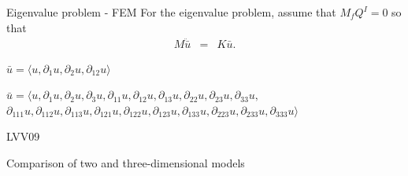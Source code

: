 \documentclass{beamer}
\begin{document}
\begin{frame}{Eigenvalue problem - FEM}
    For the eigenvalue problem, assume that $M_{f}Q^I = 0$ so that 
\begin{eqnarray}
		M\ddot{\bar{u}} & = & K\bar{u}.\label{eq:2DFEM:M2}
\end{eqnarray}

$\bar{u} = \langle u, \partial_1 u, \partial_2 u, \partial_{12} u \rangle$


$\bar{u} = \langle u, \partial_1 u, \partial_2 u, \partial_3 u, \partial_{11} u, \partial_{12}u, \partial_{13}u,\partial_{22}u,\partial_{23}u, \partial_{33}u,$\\$ \partial_{111}u, \partial_{112}u, \partial_{113}u, \partial_{121}u, \partial_{122}u, \partial_{123}u, \partial_{133}u,\partial_{223}u,\partial_{233}u,\partial_{333}u \rangle$
\end{frame}

\begin{frame}{LVV09}
    
\end{frame}

\begin{frame}{Comparison of two and three-dimensional models}
    
\end{frame}
\end{document}
